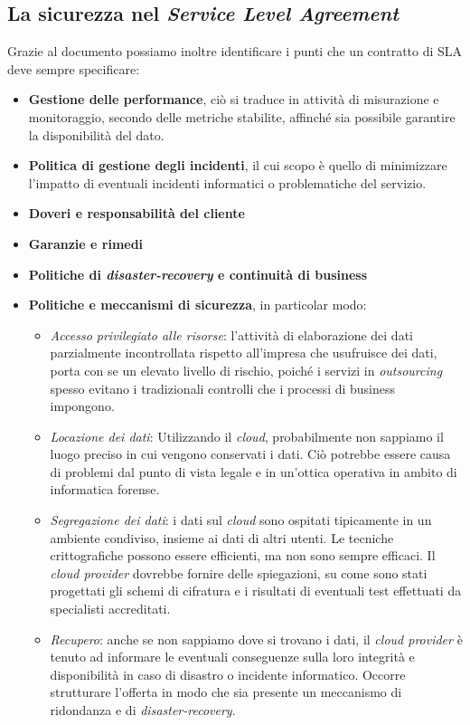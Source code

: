 \documentclass[../main.tex]{subfiles}
\begin{document}
\subsection {La sicurezza nel \textit{Service Level Agreement}}
Grazie al documento \cite{CloudSecurityIssues} possiamo inoltre identificare i punti che un contratto di SLA deve sempre specificare:
\begin{itemize}
\item \textbf{Gestione delle performance}, ciò si traduce in attività di misurazione e monitoraggio, secondo delle metriche stabilite, affinché sia possibile garantire la disponibilità del dato.
\item \textbf{Politica di gestione degli incidenti}, il cui scopo è quello di minimizzare l'impatto di eventuali incidenti informatici o problematiche del servizio.
\item \textbf{Doveri e responsabilità del cliente}
\item \textbf{Garanzie e rimedi}
\item \textbf{Politiche di \textit{disaster-recovery} e continuità di business}
\item \textbf{Politiche e meccanismi di sicurezza}, in particolar modo:
\begin{itemize}
\item \textit{Accesso privilegiato alle risorse}: l'attività di elaborazione dei dati parzialmente incontrollata rispetto all'impresa che usufruisce dei dati, porta con se un elevato livello di rischio, poiché i servizi in \textit{outsourcing} spesso evitano i tradizionali controlli che i processi di business impongono.
\item \textit{Locazione dei dati}: Utilizzando il \textit{cloud}, probabilmente non sappiamo il luogo preciso in cui vengono conservati i dati. Ciò potrebbe essere causa di problemi dal punto di vista legale e in un'ottica operativa in ambito di informatica forense.
\item \textit{Segregazione dei dati}: i dati sul \textit{cloud} sono ospitati tipicamente in un ambiente condiviso, insieme ai dati di altri utenti. Le tecniche crittografiche possono essere efficienti, ma non sono sempre efficaci. Il \textit{cloud provider} dovrebbe fornire delle spiegazioni, su come sono stati progettati gli schemi di cifratura e i risultati di eventuali test effettuati da specialisti accreditati.
\item \textit{Recupero}: anche se non sappiamo dove si trovano i dati, il \textit{cloud provider} è tenuto ad informare le eventuali conseguenze sulla loro integrità e disponibilità in caso di disastro o incidente informatico. Occorre strutturare l'offerta in modo che sia presente un meccanismo di ridondanza e di \textit{disaster-recovery}.

\end{itemize}
\end{itemize}
\end{document}
